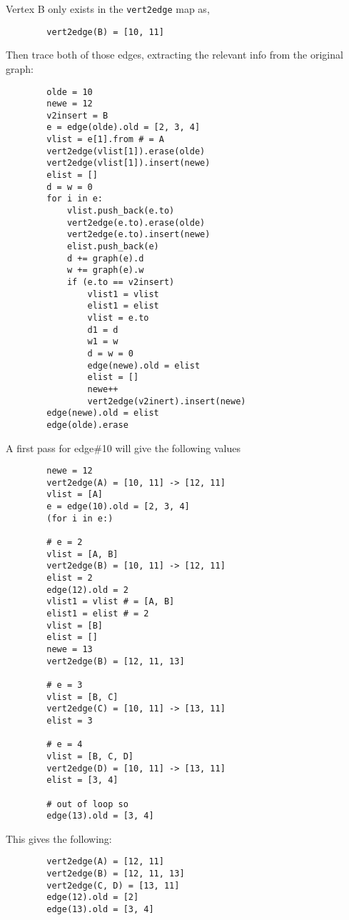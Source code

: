     Vertex B only exists in the {\tt vert2edge} map as,
    \begin{lstlisting}
        vert2edge(B) = [10, 11]
    \end{lstlisting}
    Then trace both of those edges, extracting the relevant info from the original graph:
    \begin{lstlisting}
        olde = 10
        newe = 12
        v2insert = B
        e = edge(olde).old = [2, 3, 4]
        vlist = e[1].from # = A
        vert2edge(vlist[1]).erase(olde)
        vert2edge(vlist[1]).insert(newe)
        elist = []
        d = w = 0
        for i in e:
            vlist.push_back(e.to)
            vert2edge(e.to).erase(olde)
            vert2edge(e.to).insert(newe)
            elist.push_back(e)
            d += graph(e).d
            w += graph(e).w
            if (e.to == v2insert)
                vlist1 = vlist
                elist1 = elist
                vlist = e.to
                d1 = d
                w1 = w
                d = w = 0
                edge(newe).old = elist
                elist = []
                newe++
                vert2edge(v2inert).insert(newe)
        edge(newe).old = elist
        edge(olde).erase
    \end{lstlisting}
    A first pass for edge\#10 will give the following values
    \begin{lstlisting}
        newe = 12
        vert2edge(A) = [10, 11] -> [12, 11]
        vlist = [A]
        e = edge(10).old = [2, 3, 4]
        (for i in e:)

        # e = 2
        vlist = [A, B]
        vert2edge(B) = [10, 11] -> [12, 11]
        elist = 2
        edge(12).old = 2
        vlist1 = vlist # = [A, B]
        elist1 = elist # = 2
        vlist = [B]
        elist = []
        newe = 13
        vert2edge(B) = [12, 11, 13]

        # e = 3
        vlist = [B, C]
        vert2edge(C) = [10, 11] -> [13, 11]
        elist = 3

        # e = 4
        vlist = [B, C, D]
        vert2edge(D) = [10, 11] -> [13, 11]
        elist = [3, 4]

        # out of loop so
        edge(13).old = [3, 4]
    \end{lstlisting}
    This gives the following:
    \begin{lstlisting}
        vert2edge(A) = [12, 11]
        vert2edge(B) = [12, 11, 13]
        vert2edge(C, D) = [13, 11]
        edge(12).old = [2]
        edge(13).old = [3, 4]
    \end{lstlisting}
